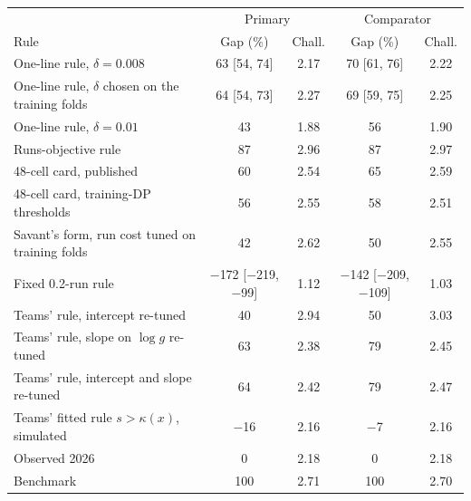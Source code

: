 \begin{tabular}{p{4.2cm}cccc}
\toprule
 & \multicolumn{2}{c}{Primary} & \multicolumn{2}{c}{Comparator} \\
Rule & Gap (\%) & Chall. & Gap (\%) & Chall. \\
\midrule
One-line rule, $\delta=0.008$ & 63 [54, 74] & 2.17 & 70 [61, 76] & 2.22 \\
One-line rule, $\delta$ chosen on the training folds & 64 [54, 73] & 2.27 & 69 [59, 75] & 2.25 \\
One-line rule, $\delta=0.01$ & 43 & 1.88 & 56 & 1.90 \\
Runs-objective rule \citep{Namuduri2026runs} & 87 & 2.96 & 87 & 2.97 \\
48-cell card, published \citep{Arora2026use} & 60 & 2.54 & 65 & 2.59 \\
48-cell card, training-DP thresholds & 56 & 2.55 & 58 & 2.51 \\
Savant's form, run cost tuned on training folds & 42 & 2.62 & 50 & 2.55 \\
Fixed 0.2-run rule \citep{Savant2026abs} & \ensuremath{-}172 [\ensuremath{-}219, \ensuremath{-}99] & 1.12 & \ensuremath{-}142 [\ensuremath{-}209, \ensuremath{-}109] & 1.03 \\
Teams' rule, intercept re-tuned & 40 & 2.94 & 50 & 3.03 \\
Teams' rule, slope on $\log g$ re-tuned & 63 & 2.38 & 79 & 2.45 \\
Teams' rule, intercept and slope re-tuned & 64 & 2.42 & 79 & 2.47 \\
Teams' fitted rule $s>\kappa(x)$, simulated & \ensuremath{-}16 & 2.16 & \ensuremath{-}7 & 2.16 \\
Observed 2026 & 0 & 2.18 & 0 & 2.18 \\
Benchmark & 100 & 2.71 & 100 & 2.70 \\
\bottomrule
\end{tabular}
